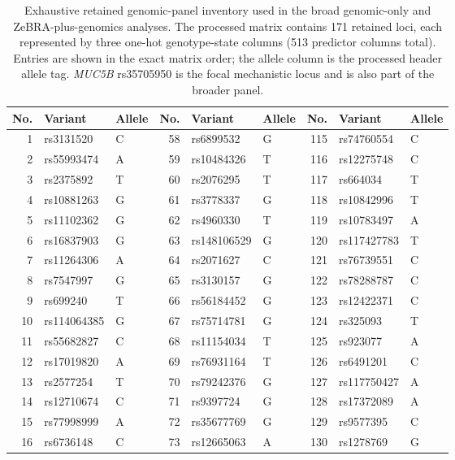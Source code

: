 \begin{table}[!t]
\caption{Exhaustive retained genomic-panel inventory used in the broad genomic-only and ZeBRA-plus-genomics analyses. The processed matrix contains 171 retained loci, each represented by three one-hot genotype-state columns (513 predictor columns total). Entries are shown in the exact matrix order; the allele column is the processed header allele tag. \textit{MUC5B} rs35705950 is the focal mechanistic locus and is also part of the broader panel.}
\label{tab:supp-genomic-inventory}
\centering\tiny
\setlength{\tabcolsep}{2.6pt}
\renewcommand{\arraystretch}{0.88}
\begin{adjustbox}{max width=\textwidth}
\begin{tabular}{rll@{\hspace{6pt}}rll@{\hspace{6pt}}rll}
\toprule
No. & Variant & Allele & No. & Variant & Allele & No. & Variant & Allele\\
\midrule
1 & rs3131520 & C & 58 & rs6899532 & G & 115 & rs74760554 & C\\
2 & rs55993474 & A & 59 & rs10484326 & T & 116 & rs12275748 & C\\
3 & rs2375892 & T & 60 & rs2076295 & T & 117 & rs664034 & T\\
4 & rs10881263 & G & 61 & rs3778337 & G & 118 & rs10842996 & T\\
5 & rs11102362 & G & 62 & rs4960330 & T & 119 & rs10783497 & A\\
6 & rs16837903 & G & 63 & rs148106529 & G & 120 & rs117427783 & T\\
7 & rs11264306 & A & 64 & rs2071627 & C & 121 & rs76739551 & C\\
8 & rs7547997 & G & 65 & rs3130157 & G & 122 & rs78288787 & C\\
9 & rs699240 & T & 66 & rs56184452 & G & 123 & rs12422371 & C\\
10 & rs114064385 & G & 67 & rs75714781 & G & 124 & rs325093 & T\\
11 & rs55682827 & C & 68 & rs11154034 & T & 125 & rs923077 & A\\
12 & rs17019820 & A & 69 & rs76931164 & T & 126 & rs6491201 & C\\
13 & rs2577254 & T & 70 & rs79242376 & G & 127 & rs117750427 & A\\
14 & rs12710674 & C & 71 & rs9397724 & G & 128 & rs17372089 & A\\
15 & rs77998999 & A & 72 & rs35677769 & G & 129 & rs9577395 & C\\
16 & rs6736148 & C & 73 & rs12665063 & A & 130 & rs1278769 & G\\

\end{tabular}
\end{adjustbox}
\end{table}
